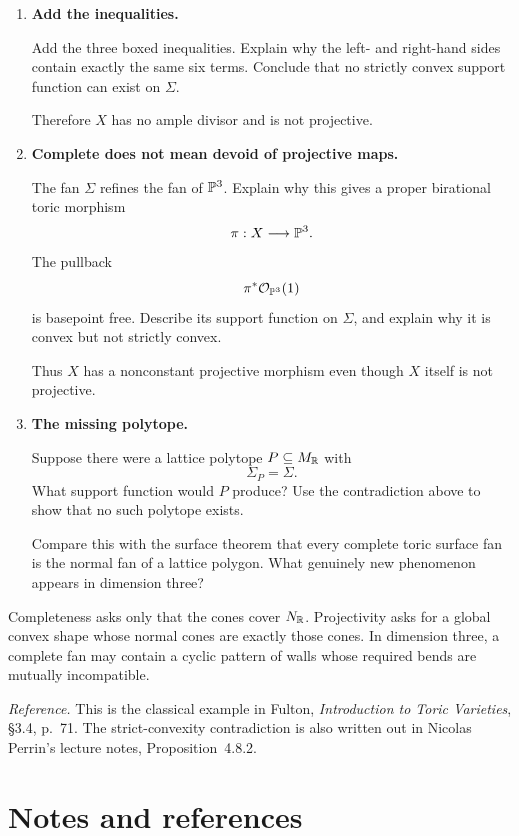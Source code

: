 \begin{enumerate}[label=\textbf{Hint \arabic*.},wide=0pt]
\item \textbf{Add the inequalities.}

Add the three boxed inequalities. Explain why the left- and right-hand
sides contain exactly the same six terms. Conclude that no strictly
convex support function can exist on \(\Sigma\).

Therefore \(X\) has no ample divisor and is not projective.

\item \textbf{Complete does not mean devoid of projective maps.}

The fan \(\Sigma\) refines the fan of \(\mathbb{P}^3\). Explain why this gives
a proper birational toric morphism
\[
\pi:X\longrightarrow\mathbb{P}^3.
\]
The pullback
\[
\pi^*\mathcal O_{\mathbb{P}^3}(1)
\]
is basepoint free. Describe its support function on \(\Sigma\), and
explain why it is convex but not strictly convex.

Thus \(X\) has a nonconstant projective morphism even though \(X\)
itself is not projective.

\item \textbf{The missing polytope.}

Suppose there were a lattice polytope \(P\subseteq M_{\mathbb{R}}\) with
\[
\Sigma_P=\Sigma.
\]
What support function would \(P\) produce? Use the contradiction above
to show that no such polytope exists.

Compare this with the surface theorem that every complete toric
surface fan is the normal fan of a lattice polygon. What genuinely new
phenomenon appears in dimension three?

\end{enumerate}

\begin{tcolorbox}[
  colback=PredictionTeal!5,
  colframe=PredictionTeal,
  title={The lesson of the example},
  fonttitle=\bfseries
]
Completeness asks only that the cones cover \(N_{\mathbb{R}}\). Projectivity
asks for a global convex shape whose normal cones are exactly those
cones. In dimension three, a complete fan may contain a cyclic pattern
of walls whose required bends are mutually incompatible.
\end{tcolorbox}

\noindent
\textit{Reference.}
This is the classical example in Fulton, \emph{Introduction to Toric
Varieties}, \S3.4, p.~71. The strict-convexity contradiction is also
written out in Nicolas Perrin's lecture notes, Proposition~4.8.2.

\clearpage
\section*{Notes and references}

